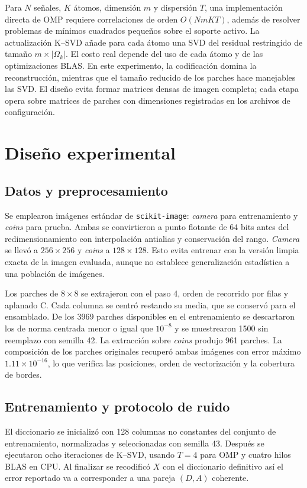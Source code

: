 \documentclass[conference]{IEEEtran}
\begin{document}
Para $N$ señales, $K$ átomos, dimensión $m$ y dispersión $T$, una implementación directa de OMP requiere correlaciones de orden $O(NmKT)$, además de resolver problemas de mínimos cuadrados pequeños sobre el soporte activo. La actualización K--SVD añade para cada átomo una SVD del residual restringido de tamaño $m\times|\Omega_k|$. El costo real depende del uso de cada átomo y de las optimizaciones BLAS. En este experimento, la codificación domina la reconstrucción, mientras que el tamaño reducido de los parches hace manejables las SVD. El diseño evita formar matrices densas de imagen completa; cada etapa opera sobre matrices de parches con dimensiones registradas en los archivos de configuración.

\section{Diseño experimental}
\subsection{Datos y preprocesamiento}
Se emplearon imágenes estándar de \texttt{scikit-image}: \emph{camera} para entrenamiento y \emph{coins} para prueba. Ambas se convirtieron a punto flotante de 64 bits antes del redimensionamiento con interpolación antialias y conservación del rango. \emph{Camera} se llevó a $256\times256$ y \emph{coins} a $128\times128$. Esto evita entrenar con la versión limpia exacta de la imagen evaluada, aunque no establece generalización estadística a una población de imágenes.

Los parches de $8\times8$ se extrajeron con el paso 4, orden de recorrido por filas y aplanado C. Cada columna se centró restando su media, que se conservó para el ensamblado. De los 3969 parches disponibles en el entrenamiento se descartaron los de norma centrada menor o igual que $10^{-8}$ y se muestrearon 1500 sin reemplazo con semilla 42. La extracción sobre \emph{coins} produjo 961 parches. La composición de los parches originales recuperó ambas imágenes con error máximo $1.11\times10^{-16}$, lo que verifica las posiciones, orden de vectorización y la cobertura de bordes.

\subsection{Entrenamiento y protocolo de ruido}
El diccionario se inicializó con 128 columnas no constantes del conjunto de entrenamiento, normalizadas y seleccionadas con semilla 43. Después se ejecutaron ocho iteraciones de K--SVD, usando $T=4$ para OMP y cuatro hilos BLAS en CPU. Al finalizar se recodificó $X$ con el diccionario definitivo así el error reportado va a corresponder a una pareja $(D,A)$ coherente.
\end{document}
